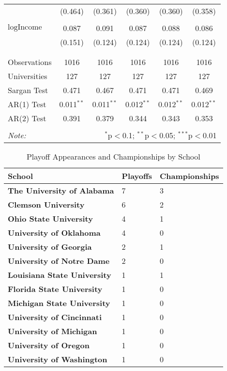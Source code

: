 \documentclass[12pt,english]{article}
\begin{document}
\begin{table}
\begin{tabular}{@{\extracolsep{5pt}}lccccc}
  & (0.464) & (0.361) & (0.360) & (0.360) & (0.358) \\ 
  & & & & & \\ 
 $\text{logIncome}$ & 0.087 & 0.091 & 0.087 & 0.088 & 0.086 \\ 
  & (0.151) & (0.124) & (0.124) & (0.124) & (0.124) \\ 
  & & & & & \\ 
\hline \\[-1.8ex] 
Observations & 1016 & 1016 & 1016 & 1016 & 1016 \\ 
Universities & 127 & 127 & 127 & 127 & 127 \\
Sargan Test & 0.471 & 0.467 & 0.471 & 0.471 & 0.469 \\
AR(1) Test & 0.011$^{**}$ & 0.011$^{**}$ & 0.012$^{**}$ & 0.012$^{**}$ & 0.012$^{**}$ \\
AR(2) Test & 0.391 & 0.379 & 0.344 & 0.343 & 0.353 \\
\hline 
\hline \\[-1.8ex] 
\textit{Note:}  & \multicolumn{5}{r}{$^{*}$p$<$0.1; $^{**}$p$<$0.05; $^{***}$p$<$0.01} \\ 
\end{tabular} 
\end{table}

\begin{table}[!h]
\centering
\caption{Playoff Appearances and Championships by School}
\begin{tabular}{p{6cm}p{3cm}p{3cm}}
\toprule
\textbf{School} & \textbf{Playoffs} & \textbf{Championships} \\
\midrule
\rowcolor{gray!10}\textbf{The University of Alabama} & 7 & 3 \\
\addlinespace
\textbf{Clemson University} & 6 & 2 \\
\addlinespace
\rowcolor{gray!10}\textbf{Ohio State University} & 4 & 1 \\
\addlinespace
\textbf{University of Oklahoma} & 4 & 0 \\
\addlinespace
\rowcolor{gray!10}\textbf{University of Georgia} & 2 & 1 \\
\addlinespace
\textbf{University of Notre Dame} & 2 & 0 \\
\addlinespace
\rowcolor{gray!10}\textbf{Louisiana State University} & 1 & 1 \\
\addlinespace
\textbf{Florida State University} & 1 & 0 \\
\addlinespace
\rowcolor{gray!10}\textbf{Michigan State University} & 1 & 0 \\
\addlinespace
\textbf{University of Cincinnati} & 1 & 0 \\
\addlinespace
\rowcolor{gray!10}\textbf{University of Michigan} & 1 & 0 \\
\addlinespace
\textbf{University of Oregon} & 1 & 0 \\
\addlinespace
\rowcolor{gray!10}\textbf{University of Washington} & 1 & 0 \\
\bottomrule
\end{tabular}
\end{table}
\end{document}
